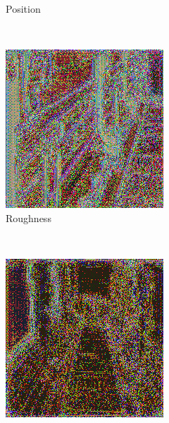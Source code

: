 \begin{figure}[h!]
\begin{subfigure}[b]{0.175\textwidth}
     \caption{Position}
    \end{subfigure}
    ~
    \begin{subfigure}[b]{0.175\textwidth}
     \includegraphics[width=\textwidth]{figures/result/quadruple/depth_albedo_normal_roughness/1.png}
     \caption{Roughness}\label{subfig:1}
    \end{subfigure}
    \\ \vspace{0.2cm}
    \begin{subfigure}[b]{0.175\textwidth}
     \includegraphics[width=\textwidth]{figures/result/quadruple/depth_albedo_normal_emissive/2.png}

\end{subfigure}
\end{figure}
